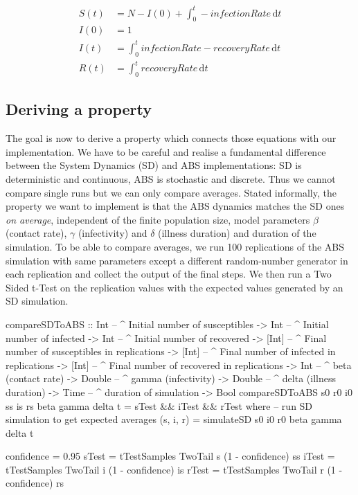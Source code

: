 \begin{align}
S(t) &= N - I(0) + \int_0^t -infectionRate\, \mathrm{d}t \\
I(0) &= 1 \\
I(t) &= \int_0^t infectionRate - recoveryRate\, \mathrm{d}t \\
R(t) &= \int_0^t recoveryRate\, \mathrm{d}t
\end{align}

\subsection{Deriving a property}
The goal is now to derive a property which connects those equations with our implementation. We have to be careful and realise a fundamental difference between the System Dynamics (SD) and ABS implementations: SD is deterministic and continuous, ABS is stochastic and discrete. Thus we cannot compare single runs but we can only compare averages. Stated informally, the property we want to implement is that the ABS dynamics matches the SD ones \textit{on average}, independent of the finite population size, model parameters $\beta$ (contact rate), $\gamma$ (infectivity) and $\delta$ (illness duration) and duration of the simulation. To be able to compare averages, we run 100 replications of the ABS simulation with same parameters except a different random-number generator in each replication and collect the output of the final steps. We then run a Two Sided t-Test on the replication values with the expected values generated by an SD simulation.

\begin{HaskellCode}
compareSDToABS :: Int    -- ^ Initial number of susceptibles
               -> Int    -- ^ Initial number of infected
               -> Int    -- ^ Initial number of recovered
               -> [Int]  -- ^ Final number of susceptibles in replications
               -> [Int]  -- ^ Final number of infected in replications
               -> [Int]  -- ^ Final number of recovered in replications
               -> Int    -- ^ beta (contact rate)
               -> Double -- ^ gamma (infectivity)
               -> Double -- ^ delta (illness duration)
               -> Time   -- ^ duration of simulation
               -> Bool
compareSDToABS s0 r0 i0
               ss is rs
               beta gamma delta t = sTest && iTest && rTest
  where
    -- run SD simulation to get expected averages
    (s, i, r) = simulateSD s0 i0 r0 beta gamma delta t
    
    confidence = 0.95
    sTest = tTestSamples TwoTail s (1 - confidence) ss
    iTest = tTestSamples TwoTail i (1 - confidence) is
    rTest = tTestSamples TwoTail r (1 - confidence) rs
\end{HaskellCode}

